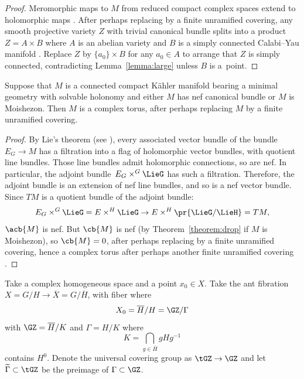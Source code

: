 \begin{proof}
Meromorphic maps to $M$ from reduced compact complex spaces extend to holomorphic maps \cite[Lemma 26]{Biswas.McKay:2016}.
After perhaps replacing by a finite unramified covering, any smooth projective variety $Z$ with trivial canonical bundle splits into a product $Z=A \times B$ where $A$ is an abelian variety and $B$ is a simply connected Calabi--Yau manifold \cite{Bogomolov:1974}.
Replace $Z$ by $\{a_0\} \times B$ for any $a_0 \in A$ to arrange that $Z$ is simply connected, contradicting
Lemma~\ref{lemma:large} unless $B$ is a~point.
\end{proof}

\begin{Lemma}\label{lemma:solvable.nef}
Suppose that $M$ is a connected compact K\"ahler manifold bearing a minimal geometry with solvable holonomy and either $M$ has nef canonical bundle or $M$ is Moishezon.
Then $M$ is a complex torus, after perhaps replacing $M$ by a finite unramified covering.
\end{Lemma}

\begin{proof}
By Lie's theorem (see \cite[Theorem 3]{Serre:2001}), every associated vector bundle of the bundle $E_G \to M$ has a filtration into a flag of holomorphic vector bundles, with quotient line bundles.
Those line bundles admit holomorphic connections, so are nef.
In particular, the adjoint bundle~$E_G \times^G \LieG$ has such a filtration.
Therefore, the adjoint bundle is an extension of nef line bundles, and so is a nef vector bundle.
Since $TM$ is a quotient bundle of the adjoint bundle:
\[
E_G \times^G \LieG = E \times^H \LieG \to E \times^H \pr{\LieG/\LieH} = TM,
\]
$\acb{M}$ is nef.
But $\cb{M}$ is nef (by Theorem~\ref{theorem:drop} if $M$ is Moishezon), so $\cb{M} = 0$, after perhaps replacing by a finite unramified covering, hence a complex torus after perhaps another finite unramified covering \cite{Biswas.McKay:2010}.
\end{proof}

Take a complex homogeneous space  and a point $x_0 \in X$.
Take the ant fibration $X = G/H \to \overline{X} = G/\overline{H}$, with fiber  where
\[
X_0 = \overline{H}/H = \GZ/\Gamma
\]
with $\GZ = \overline{H}/K$ and $\Gamma = H/K$ where
\[
K = \bigcap_{g\in\overline{H}} gHg^{-1}
\]
contains $H^0$.
Denote the universal covering group as $\tGZ \to \GZ$ and let $\widetilde{\Gamma} \subset \tGZ$ be the
preimage of $\Gamma \subset \GZ$.

